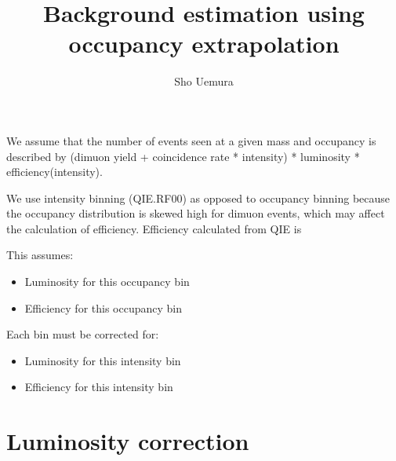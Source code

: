 \documentclass{article}
\author{Sho Uemura}
\title{Background estimation using occupancy extrapolation}
\date{}
\begin{document}
\maketitle

We assume that the number of events seen at a given mass and occupancy is described by 
(dimuon yield + coincidence rate * intensity) * luminosity * efficiency(intensity).

We use intensity binning (QIE.RF00) as opposed to occupancy binning because the occupancy distribution is skewed high for dimuon events, which may affect the calculation of efficiency.
Efficiency calculated from QIE is 

This assumes:

\begin{itemize}
\item Luminosity for this occupancy bin
\item Efficiency for this occupancy bin
\end{itemize}

Each bin must be corrected for:
\begin{itemize}
\item Luminosity for this intensity bin
\item Efficiency for this intensity bin
\end{itemize}

\section{Luminosity correction}
\end{document}
